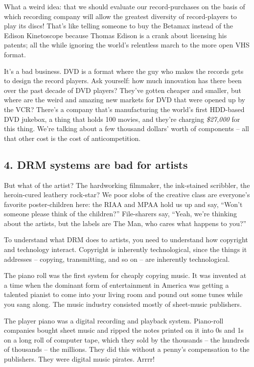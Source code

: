 What a weird idea: that we should evaluate our record-pur\-chases on
the basis of which recording company will allow the greatest
diversity of record-players to play its discs! That's like telling
someone to buy the Betamax instead of the Edison Kinetoscope
because Thomas Edison is a crank about licensing his patents; all
the while ignoring the world's relentless march to the more open
VHS format.

It's a bad business. DVD is a format where the guy who makes the
records gets to design the record players. Ask yourself: how much
innovation has there been over the past decade of DVD players?
They've gotten cheaper and smaller, but where are the weird and
amazing new markets for DVD that were opened up by the VCR? There's
a company that's manufacturing the world's first HDD-based DVD
jukebox, a thing that holds 100 movies, and they're charging
\emph{\$27,000} for this thing. We're talking about a few
thousand dollars' worth of components -- all that other cost is the
cost of anticompetition.

\subsection{4. DRM systems are bad for artists}

But what of the artist? The hardworking filmmaker, the ink-stained
scribbler, the heroin-cured leathery rock-star? We poor slobs of
the creative class are everyone's favorite poster-children here:
the RIAA and MPAA hold us up and say, ``Won't someone please think
of the children?'' File-sharers say, ``Yeah, we're thinking about the
artists, but the labels are The Man, who cares what happens to
you?''

To understand what DRM does to artists, you need to understand how
copyright and technology interact. Copyright is inherently
technological, since the things it addresses -- copying,
transmitting, and so on -- are inherently technological.

The piano roll was the first system for cheaply copying music. It
was invented at a time when the dominant form of entertainment in
America was getting a talented pianist to come into your living
room and pound out some tunes while you sang along. The music
industry consisted mostly of sheet-music publishers.

The player piano was a digital recording and playback system.
Piano-roll companies bought sheet music and ripped the notes
printed on it into 0s and 1s on a long roll of computer tape, which
they sold by the thousands -- the hundreds of thousands -- the
millions. They did this without a penny's compensation to the
publishers. They were digital music pirates. Arrrr!

